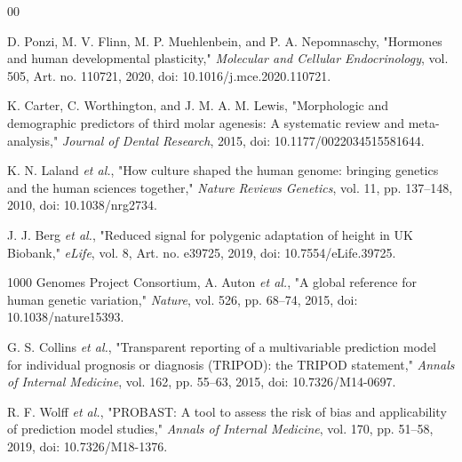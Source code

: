 \documentclass[conference]{IEEEtran}
\begin{document}
\begin{thebibliography}{00}

D. Ponzi, M. V. Flinn, M. P. Muehlenbein, and P. A. Nepomnaschy,
"Hormones and human developmental plasticity," \emph{Molecular and Cellular
Endocrinology}, vol. 505, Art. no. 110721, 2020, doi:
10.1016/j.mce.2020.110721.

K. Carter, C. Worthington, and J. M. A. M. Lewis, "Morphologic and
demographic predictors of third molar agenesis: A systematic review and
meta-analysis," \emph{Journal of Dental Research}, 2015, doi:
10.1177/0022034515581644.

K. N. Laland \emph{et al.}, "How culture shaped the human genome:
bringing genetics and the human sciences together," \emph{Nature Reviews
Genetics}, vol. 11, pp. 137--148, 2010, doi: 10.1038/nrg2734.

J. J. Berg \emph{et al.}, "Reduced signal for polygenic adaptation of
height in UK Biobank," \emph{eLife}, vol. 8, Art. no. e39725, 2019, doi:
10.7554/eLife.39725.

1000 Genomes Project Consortium, A. Auton \emph{et al.}, "A global
reference for human genetic variation," \emph{Nature}, vol. 526, pp.
68--74, 2015, doi: 10.1038/nature15393.

G. S. Collins \emph{et al.}, "Transparent reporting of a multivariable
prediction model for individual prognosis or diagnosis (TRIPOD): the TRIPOD
statement," \emph{Annals of Internal Medicine}, vol. 162, pp. 55--63, 2015,
doi: 10.7326/M14-0697.

R. F. Wolff \emph{et al.}, "PROBAST: A tool to assess the risk of bias and
applicability of prediction model studies," \emph{Annals of Internal
Medicine}, vol. 170, pp. 51--58, 2019, doi: 10.7326/M18-1376.

\end{thebibliography}
\end{document}
